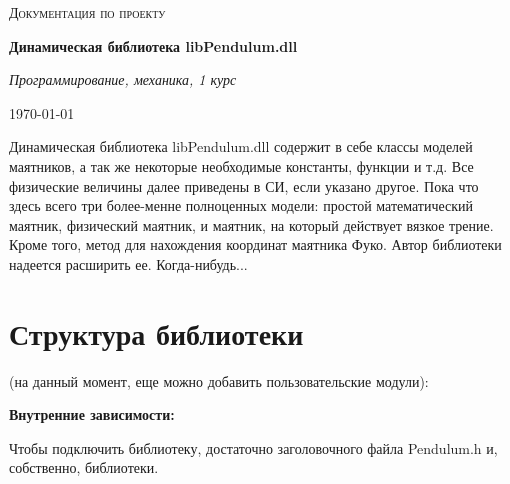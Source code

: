 \documentclass {report}
\begin{document}
\begin{titlepage}
	\centering
	{\scshape\Large Документация по проекту\par}
	\vspace{1.5cm}
	{\huge\bfseries Динамическая библиотека libPendulum.dll \par}
	\vspace{2cm}
	{\itshape Программирование, механика, 1 курс\par}
	\vfill
	{\large \today\par}
\end{titlepage}
\tableofcontents
\newpage
Динамическая библиотека libPendulum.dll содержит в себе классы моделей маятников, а так же некоторые необходимые константы, функции и т.д. Все физические величины далее приведены в СИ, если указано другое. Пока что здесь всего три более-менне полноценных модели: простой математический маятник, физический маятник, и маятник, на который действует вязкое трение. Кроме того, метод для нахождения координат маятника Фуко. Автор библиотеки надеется расширить ее. Когда-нибудь...
\newline
\section{Структура библиотеки}
{ (на данный момент, еще можно добавить пользовательские модули):}
\begin{center}
\end{center}
{\centering \bfseries Внутренние зависимости:}
\begin{center}
\end{center}
Чтобы подключить библиотеку, достаточно заголовочного файла Pendulum.h и, собственно, библиотеки.
\end{document}

